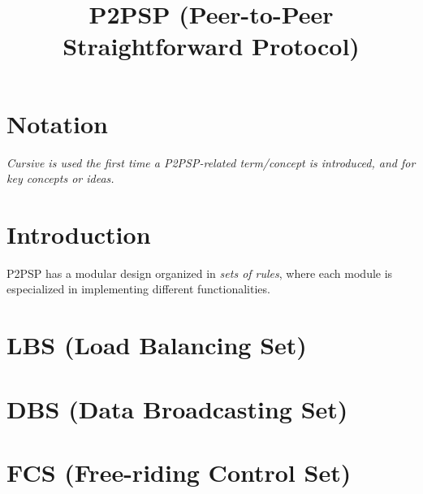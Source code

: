 

\newcommand{\note}[1]{#1}


\newenvironment{notex}
               {\textbf{Note:}
               }
               {
               }

\title{P2PSP (Peer-to-Peer Straightforward Protocol)}
\maketitle

\begin{abstract}

\end{abstract}

\section*{Notation}
\emph{Cursive is used the first time a P2PSP-related term/concept is introduced, and for key concepts or ideas.}

\section*{Introduction}
P2PSP has a modular design organized in \emph{sets of rules}, where
each module is especialized in implementing different functionalities.

\tableofcontents

\section{LBS (Load Balancing Set)}


\section{DBS (Data Broadcasting Set)}


\section{FCS (Free-riding Control Set)}


